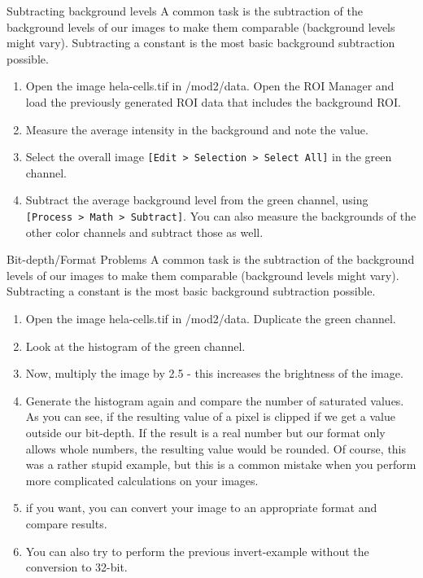 \begin{taskbox}{Subtracting background levels}
A common task is the subtraction of the background levels of our images to make them comparable (background levels might vary). Subtracting a constant is the most basic background subtraction possible. 

\begin{enumerate}
	\item Open the image hela-cells.tif in /mod2/data. Open the ROI Manager and load the previously generated ROI data that includes the background ROI.
	\item Measure the average intensity in the background and note the value.
	\item Select the overall image \texttt{[Edit > Selection > Select All]} in the green channel. 
	\item Subtract the average background level from the green channel, using \texttt{[Process > Math > Subtract]}. You can also measure the backgrounds of the other color channels and subtract those as well.
\end{enumerate}

\end{taskbox}

\begin{taskbox}{Bit-depth/Format Problems}
A common task is the subtraction of the background levels of our images to make them comparable (background levels might vary). Subtracting a constant is the most basic background subtraction possible. 

\begin{enumerate}
	\item Open the image hela-cells.tif in /mod2/data. Duplicate the green channel.
	\item Look at the histogram of the green channel.
	\item Now, multiply the image by 2.5 - this increases the brightness of the image. 
	\item Generate the histogram again and compare the number of saturated values. As you can see, if the resulting value of a pixel is clipped if we get a value outside our bit-depth. If the result is a real number but our format only allows whole numbers, the resulting value would be rounded. Of course, this was a rather stupid example, but this is a common mistake when you perform more complicated calculations on your images.
	\item if you want, you can convert your image to an appropriate format and compare results.
	\item You can also try to perform the previous invert-example without the conversion to 32-bit.
	\end{enumerate}
	
\end{taskbox}

